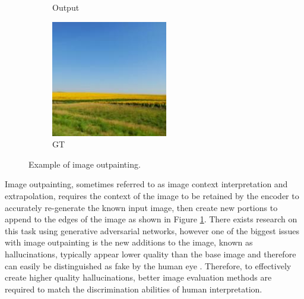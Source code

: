 \documentclass{article}
\begin{document}
\begin{figure}
\begin{subfigure}[b]{0.15\textwidth}
        \caption{Output}
    \end{subfigure}
    \hfill
    \begin{subfigure}[b]{0.15\textwidth}
        \includegraphics[width=\textwidth]{figs/fig1/ground_truth}
        \caption{GT}
    \end{subfigure}
  	\caption{Example of image outpainting.}
  	\label{fig:fig1}
\end{figure}

Image outpainting, sometimes referred to as image context interpretation and extrapolation, requires the context of the image to be retained by the encoder to accurately re-generate the known input image, then create new portions to append to the edges of the image as shown in Figure \ref{fig:fig1}. There exists research on this task using generative adversarial networks, however one of the biggest issues with image outpainting is the new additions to the image, known as hallucinations, typically appear lower quality than the base image and therefore can easily be distinguished as fake by the human eye \citep{sabini_painting_2018}. Therefore, to effectively create higher quality hallucinations, better image evaluation methods are required to match the discrimination abilities of human interpretation.
\end{document}
